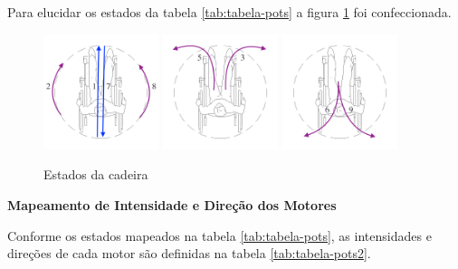   Para elucidar os estados da tabela \ref{tab:tabela-pots} a figura \ref{fig:estados} foi confeccionada.

  \begin{figure}[!ht]
    \center
    \includegraphics[width=0.3\textwidth]{figuras/resultados/estados_1_2_7_8}
    \includegraphics[width=0.3\textwidth]{figuras/resultados/estados_3_5}
    \includegraphics[width=0.3\textwidth]{figuras/resultados/estados_6_9}
    \caption{Estados da cadeira}
    \label{fig:estados}
  \end{figure}

  \textbf{Mapeamento de Intensidade e Direção dos Motores}

    Conforme os estados mapeados na tabela \ref{tab:tabela-pots}, as intensidades e direções de cada motor são definidas na tabela \ref{tab:tabela-pots2}.


